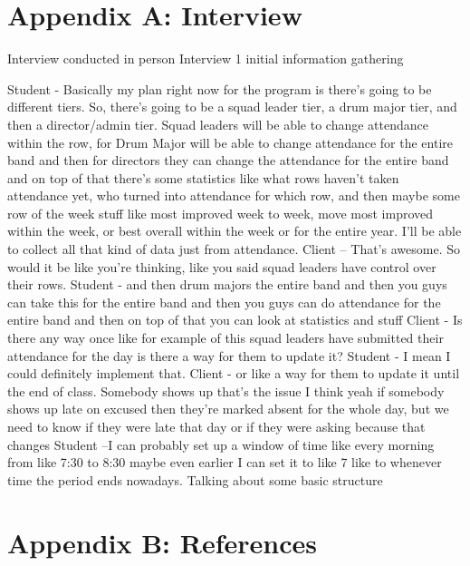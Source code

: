 \documentclass{article}
\begin{document}
\section{Appendix A: Interview}
Interview conducted in person
Interview 1 initial information gathering

Student - Basically my plan right now for the program is there's going to be different tiers. So, there’s going to be a squad leader tier, a drum major tier, and then a director/admin tier. Squad leaders will be able to change attendance within the row, for Drum Major will be able to change attendance for the entire band and then for directors they can change the attendance for the entire band and on top of that there's some statistics like what rows haven't taken attendance yet, who turned into attendance for which row, and then maybe some row of the week stuff like most improved week to week, move most improved within the week, or best overall within the week or for the entire year. I’ll be able to collect all that kind of data just from attendance.
Client – That’s awesome. So would it be like you're thinking, like you said squad leaders have control over their rows. 
Student - and then drum majors the entire band and then you guys can take this for the entire band and then you guys can do attendance for the entire band and then on top of that you can look at statistics and stuff
Client - Is there any way once like for example of this squad leaders have submitted their attendance for the day is there a way for them to update it?
Student - I mean I could definitely implement that.
Client - or like a way for them to update it until the end of class. Somebody shows up that's the issue I think yeah if somebody shows up late on excused then they're marked absent for the whole day, but we need to know if they were late that day or if they were asking because that changes 
Student –I can probably set up a window of time like every morning from like 7:30 to 8:30 maybe even earlier I can set it to like 7 like to whenever time the period ends nowadays. Talking about some basic structure %
\newpage
\section{Appendix B: References}
\nocite{*}
{}

\end{document}
